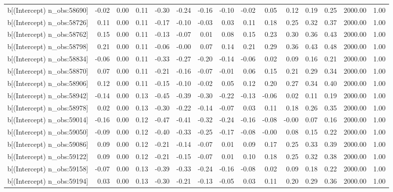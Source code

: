 \begin{table}[ht]
\begin{tabular}{rrrrrrrrrrrrrrr}
  b[(Intercept) n\_obs:58690] & -0.02 & 0.00 & 0.11 & -0.30 & -0.24 & -0.16 & -0.10 & -0.02 & 0.05 & 0.12 & 0.19 & 0.25 & 2000.00 & 1.00 \\ 
  b[(Intercept) n\_obs:58726] & 0.11 & 0.00 & 0.11 & -0.17 & -0.10 & -0.03 & 0.03 & 0.11 & 0.18 & 0.25 & 0.32 & 0.37 & 2000.00 & 1.00 \\ 
  b[(Intercept) n\_obs:58762] & 0.15 & 0.00 & 0.11 & -0.13 & -0.07 & 0.01 & 0.08 & 0.15 & 0.23 & 0.30 & 0.36 & 0.43 & 2000.00 & 1.00 \\ 
  b[(Intercept) n\_obs:58798] & 0.21 & 0.00 & 0.11 & -0.06 & -0.00 & 0.07 & 0.14 & 0.21 & 0.29 & 0.36 & 0.43 & 0.48 & 2000.00 & 1.00 \\ 
  b[(Intercept) n\_obs:58834] & -0.06 & 0.00 & 0.11 & -0.33 & -0.27 & -0.20 & -0.14 & -0.06 & 0.02 & 0.09 & 0.16 & 0.21 & 2000.00 & 1.00 \\ 
  b[(Intercept) n\_obs:58870] & 0.07 & 0.00 & 0.11 & -0.21 & -0.16 & -0.07 & -0.01 & 0.06 & 0.15 & 0.21 & 0.29 & 0.34 & 2000.00 & 1.00 \\ 
  b[(Intercept) n\_obs:58906] & 0.12 & 0.00 & 0.11 & -0.15 & -0.10 & -0.02 & 0.05 & 0.12 & 0.20 & 0.27 & 0.34 & 0.40 & 2000.00 & 1.00 \\ 
  b[(Intercept) n\_obs:58942] & -0.14 & 0.00 & 0.13 & -0.45 & -0.39 & -0.30 & -0.22 & -0.13 & -0.06 & 0.02 & 0.11 & 0.19 & 2000.00 & 1.00 \\ 
  b[(Intercept) n\_obs:58978] & 0.02 & 0.00 & 0.13 & -0.30 & -0.22 & -0.14 & -0.07 & 0.03 & 0.11 & 0.18 & 0.26 & 0.35 & 2000.00 & 1.00 \\ 
  b[(Intercept) n\_obs:59014] & -0.16 & 0.00 & 0.12 & -0.47 & -0.41 & -0.32 & -0.24 & -0.16 & -0.08 & -0.00 & 0.07 & 0.16 & 2000.00 & 1.00 \\ 
  b[(Intercept) n\_obs:59050] & -0.09 & 0.00 & 0.12 & -0.40 & -0.33 & -0.25 & -0.17 & -0.08 & -0.00 & 0.08 & 0.15 & 0.22 & 2000.00 & 1.00 \\ 
  b[(Intercept) n\_obs:59086] & 0.09 & 0.00 & 0.12 & -0.21 & -0.14 & -0.07 & 0.01 & 0.09 & 0.17 & 0.25 & 0.33 & 0.39 & 2000.00 & 1.00 \\ 
  b[(Intercept) n\_obs:59122] & 0.09 & 0.00 & 0.12 & -0.21 & -0.15 & -0.07 & 0.01 & 0.10 & 0.18 & 0.25 & 0.32 & 0.38 & 2000.00 & 1.00 \\ 
  b[(Intercept) n\_obs:59158] & -0.07 & 0.00 & 0.13 & -0.39 & -0.33 & -0.24 & -0.16 & -0.08 & 0.02 & 0.09 & 0.18 & 0.22 & 2000.00 & 1.00 \\ 
  b[(Intercept) n\_obs:59194] & 0.03 & 0.00 & 0.13 & -0.30 & -0.21 & -0.13 & -0.05 & 0.03 & 0.11 & 0.20 & 0.29 & 0.36 & 2000.00 & 1.00 \\ 

\end{tabular}
\end{table}
